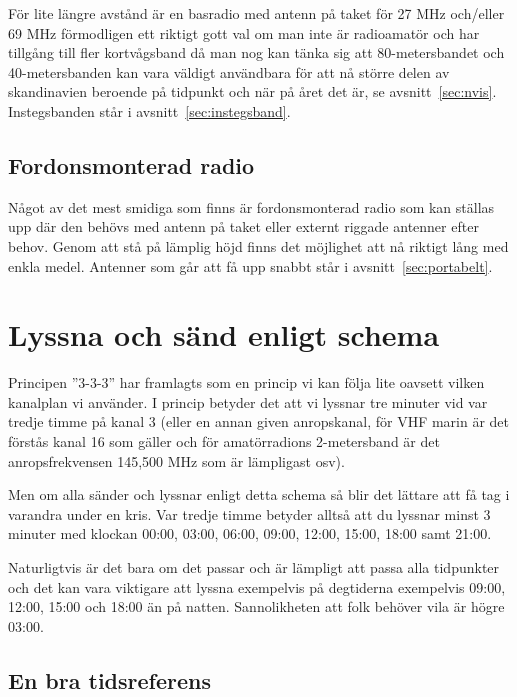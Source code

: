 För lite längre avstånd är en basradio med antenn på taket för 27 MHz
och/eller 69 MHz förmodligen ett riktigt gott val om man inte är radioamatör
och har tillgång till fler kortvågsband då man nog kan tänka sig att
80-metersbandet och 40-metersbanden kan vara väldigt användbara för att nå
större delen av skandinavien beroende på tidpunkt och när på året det är,
se avsnitt~\ref{sec:nvis}. Instegsbanden står i
avsnitt~\ref{sec:instegsband}.

\subsection{Fordonsmonterad radio}

Något av det mest smidiga som finns är fordonsmonterad radio som kan ställas
upp där den behövs med antenn på taket eller externt riggade antenner efter
behov. Genom att stå på lämplig höjd finns det möjlighet att nå riktigt lång
med enkla medel. Antenner som går att få upp snabbt står i
avsnitt~\ref{sec:portabelt}.

\section{Lyssna och sänd enligt schema}


Principen ''3-3-3'' har framlagts som en princip vi kan följa lite oavsett vilken
kanalplan vi använder. I princip betyder det att vi lyssnar tre minuter vid
var tredje timme på kanal 3 (eller en annan given anropskanal, för VHF marin
är det förstås kanal 16 som gäller och för amatörradions 2-metersband är det
anropsfrekvensen 145,500 MHz som är lämpligast osv).

Men om alla sänder och lyssnar enligt detta schema så blir det lättare att få
tag i varandra under en kris. Var tredje timme betyder alltså att du lyssnar
minst 3 minuter med klockan 00:00, 03:00, 06:00, 09:00, 12:00, 15:00, 18:00
samt 21:00.

Naturligtvis är det bara om det passar och är lämpligt att passa alla
tidpunkter och det kan vara viktigare att lyssna exempelvis på degtiderna
exempelvis 09:00, 12:00, 15:00 och 18:00 än på natten. Sannolikheten att folk
behöver vila är högre 03:00.

\subsection{En bra tidsreferens}

